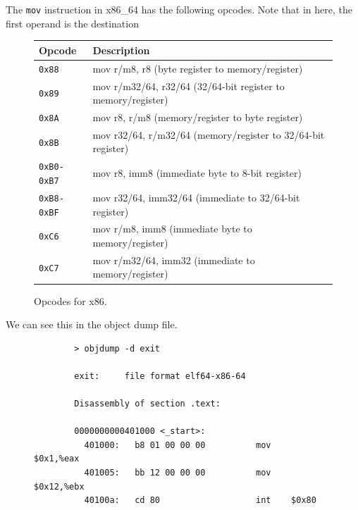   \begin{example}
    \label{ex:mov-opcodes-in-x86}
    The \texttt{mov} instruction in x86\_64 has the following opcodes. Note that in here, the first operand is the destination 

    \begin{figure}[H]
      \centering 
      \begin{tabular}{|l|l|}
        \hline
        \textbf{Opcode} & \textbf{Description} \\
        \hline
        \texttt{0x88} & mov r/m8, r8 (byte register to memory/register) \\
        \hline
        \texttt{0x89} & mov r/m32/64, r32/64 (32/64-bit register to memory/register) \\
        \hline
        \texttt{0x8A} & mov r8, r/m8 (memory/register to byte register) \\
        \hline
        \texttt{0x8B} & mov r32/64, r/m32/64 (memory/register to 32/64-bit register) \\
        \hline
        \texttt{0xB0-0xB7} & mov r8, imm8 (immediate byte to 8-bit register) \\
        \hline
        \texttt{0xB8-0xBF} & mov r32/64, imm32/64 (immediate to 32/64-bit register) \\
        \hline
        \texttt{0xC6} & mov r/m8, imm8 (immediate byte to memory/register) \\
        \hline
        \texttt{0xC7} & mov r/m32/64, imm32 (immediate to memory/register) \\
        \hline
      \end{tabular}
      \caption{Opcodes for x86.} 
    \end{figure}

    We can see this in the object dump file. 
      
    \begin{figure}[H]
      \centering 
      \begin{lstlisting}
        > objdump -d exit

        exit:     file format elf64-x86-64

        Disassembly of section .text:

        0000000000401000 <_start>:
          401000:	b8 01 00 00 00       	mov    $0x1,%eax
          401005:	bb 12 00 00 00       	mov    $0x12,%ebx
          40100a:	cd 80                	int    $0x80
      \end{lstlisting}
      \caption{} 
    \end{figure}
  \end{example}

